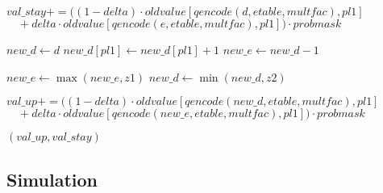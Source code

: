 \documentclass[12pt]{article}[margin=1in]
\begin{document}
\begin{algorithm}
\begin{algorithmic}[1]
        \State $val\_stay += ((1 - delta) \cdot oldvalue[qencode(d, etable, multfac), pl1]$
        \State $ \quad + delta \cdot oldvalue[qencode(e, etable, multfac), pl1]) \cdot probmask$

        \State $new\_d \gets d$
        \State $new\_d[pl1] \gets new\_d[pl1] + 1$
        \State $new\_e \gets new\_d - 1$

        \State $new\_e \gets \max(new\_e, z1)$
        \State $new\_d \gets \min(new\_d, z2)$

        \State $val\_up += ((1 - delta) \cdot oldvalue[qencode(new\_d, etable, multfac), pl1]$
        \State $ \quad + delta \cdot oldvalue[qencode(new\_e, etable, multfac), pl1]) \cdot probmask$
        \EndFor

        \State \Return $(val\_up, val\_stay)$
        \EndFunction
    \end{algorithmic}
\end{algorithm}

\subsection{Simulation}

\newpage

\end{document}
